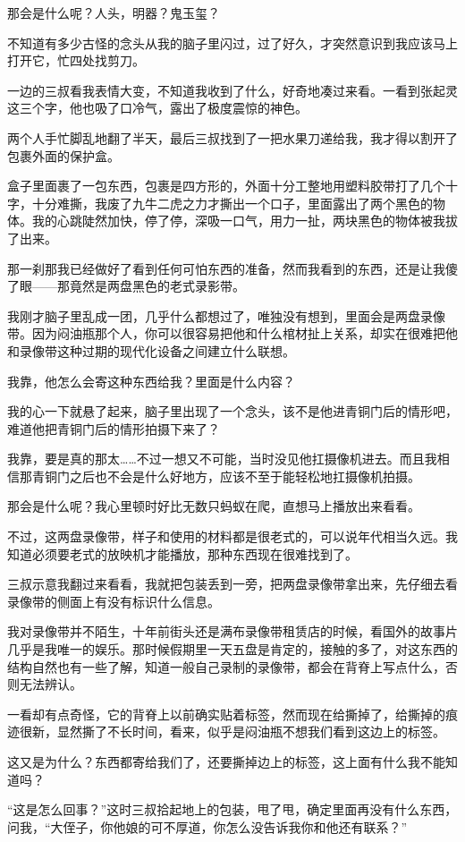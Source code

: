 那会是什么呢？人头，明器？鬼玉玺？

不知道有多少古怪的念头从我的脑子里闪过，过了好久，才突然意识到我应该马上打开它，忙四处找剪刀。

一边的三叔看我表情大变，不知道我收到了什么，好奇地凑过来看。一看到张起灵这三个字，他也吸了口冷气，露出了极度震惊的神色。

两个人手忙脚乱地翻了半天，最后三叔找到了一把水果刀递给我，我才得以割开了包裹外面的保护盒。

盒子里面裹了一包东西，包裹是四方形的，外面十分工整地用塑料胶带打了几个十字，十分难撕，我废了九牛二虎之力才撕出一个口子，里面露出了两个黑色的物体。我的心跳陡然加快，停了停，深吸一口气，用力一扯，两块黑色的物体被我拔了出来。

那一刹那我已经做好了看到任何可怕东西的准备，然而我看到的东西，还是让我傻了眼——那竟然是两盘黑色的老式录影带。

我刚才脑子里乱成一团，几乎什么都想过了，唯独没有想到，里面会是两盘录像带。因为闷油瓶那个人，你可以很容易把他和什么棺材扯上关系，却实在很难把他和录像带这种过期的现代化设备之间建立什么联想。

我靠，他怎么会寄这种东西给我？里面是什么内容？

我的心一下就悬了起来，脑子里出现了一个念头，该不是他进青铜门后的情形吧，难道他把青铜门后的情形拍摄下来了？

我靠，要是真的那太……不过一想又不可能，当时没见他扛摄像机进去。而且我相信那青铜门之后也不会是什么好地方，应该不至于能轻松地扛摄像机拍摄。

那会是什么呢？我心里顿时好比无数只蚂蚁在爬，直想马上播放出来看看。

不过，这两盘录像带，样子和使用的材料都是很老式的，可以说年代相当久远。我知道必须要老式的放映机才能播放，那种东西现在很难找到了。

三叔示意我翻过来看看，我就把包装丢到一旁，把两盘录像带拿出来，先仔细去看录像带的侧面上有没有标识什么信息。

我对录像带并不陌生，十年前街头还是满布录像带租赁店的时候，看国外的故事片几乎是我唯一的娱乐。那时候假期里一天五盘是肯定的，接触的多了，对这东西的结构自然也有一些了解，知道一般自己录制的录像带，都会在背脊上写点什么，否则无法辨认。

一看却有点奇怪，它的背脊上以前确实贴着标签，然而现在给撕掉了，给撕掉的痕迹很新，显然撕了不长时间，看来，似乎是闷油瓶不想我们看到这边上的标签。

这又是为什么？东西都寄给我们了，还要撕掉边上的标签，这上面有什么我不能知道吗？

“这是怎么回事？”这时三叔拾起地上的包装，甩了甩，确定里面再没有什么东西，问我，“大侄子，你他娘的可不厚道，你怎么没告诉我你和他还有联系？”

